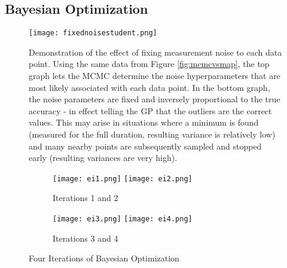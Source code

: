 \begin{appendices}

\chapter{Bayesian Optimization}
\begin{figure}[h]
\texttt{[image: fixednoisestudent.png]}
\caption{Demonstration of the effect of fixing measurement noise to each data point. Using the same data from Figure \ref{fig:mcmcvsmap}, the top graph lets the MCMC determine the noise hyperparameters that are most likely associated with each data point. In the bottom graph, the noise parameters are fixed and inversely proportional to the true accuracy - in effect telling the GP that the outliers are the correct values. This may arise in situations where a minimum is found (measured for the full duration, resulting variance is relatively low) and many nearby points are subsequently sampled and stopped early (resulting variances are very high).}
\label{fig:fixednoise}
\end{figure}

\begin{sidewaysfigure}[h]
\begin{subfigure}{\textwidth}
\texttt{[image: ei1.png]}\hfill
\texttt{[image: ei2.png]}
\caption{Iterations 1 and 2}
\end{subfigure}
\par\medskip
\begin{subfigure}{\textwidth}
\texttt{[image: ei3.png]}\hfill
\texttt{[image: ei4.png]}
\caption{Iterations 3 and 4}
\end{subfigure}
\caption{Four Iterations of Bayesian Optimization}
\label{fig:ei}
\end{sidewaysfigure}


\end{appendices}

